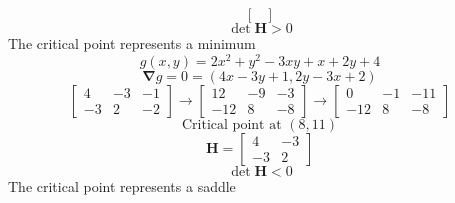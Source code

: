 \documentclass[10pt, oneside]{article}
\renewcommand{\vec}[1]{\mathbf{#1}}
\newcommand{\mat}[1]{\mathbf{#1}}
\begin{document}
\begin{itemize}
\[\begin{bmatrix}
        \end{bmatrix}
        \]
        \[\det \mat{H} > 0\]
        The critical point represents a minimum
        \[g(x,y) = 2x^2 + y^2 - 3xy + x + 2y + 4\]
        \[\vec{\nabla} g = 0 = (4x - 3y + 1, 2y - 3x + 2)\]
        \[\begin{bmatrix}
        4 & -3 & -1\\
        -3 & 2 & -2
        \end{bmatrix}
        \rightarrow
        \begin{bmatrix}
        12 & -9 & -3\\
        -12 & 8 & -8
        \end{bmatrix}
        \rightarrow
        \begin{bmatrix}
        0 & -1 & -11\\
        -12 & 8 & -8
        \end{bmatrix}\]
        \[\text{Critical point at } (8,11)\]
        \[\mat{H} = 
        \begin{bmatrix}
        4 & -3\\
        -3 & 2
        \end{bmatrix}\]
        \[\det \mat{H} < 0\]
        The critical point represents a saddle
\end{itemize}
\end{document}
